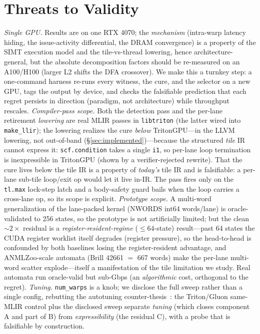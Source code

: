 \documentclass[conference]{IEEEtran}
\begin{document}
\section{Threats to Validity}
\emph{Single GPU.} Results are on one RTX 4070; the \emph{mechanism} (intra-warp latency hiding, the
issue-activity differential, the DRAM convergence) is a property of the SIMT execution model and the
tile-vs-thread lowering, hence architecture-general, but the absolute decomposition factors should be
re-measured on an A100/H100 (larger L2 shifts the DFA crossover). We make this a turnkey step: a
one-command harness re-runs every witness, the cure, and the selector on a new GPU, tags the output by
device, and checks the falsifiable prediction that each regret persists in direction (paradigm, not
architecture) while throughput rescales. \emph{Compiler-pass scope.} Both the detection pass and the per-lane
retirement \emph{lowering} are real MLIR passes in \texttt{libtriton} (the latter wired into
\texttt{make\_llir}); the lowering realizes the cure \emph{below} TritonGPU---in the LLVM lowering, not
out-of-band (\S\ref{sec:implemented})---because the structured \emph{tile} IR cannot express it:
\texttt{scf.condition} takes a single \texttt{i1}, so per-lane loop termination is inexpressible in
TritonGPU (shown by a verifier-rejected rewrite). That the cure lives below the tile IR is a property of
\emph{today's} tile IR and is falsifiable: a per-lane sub-tile loop/exit op would let it live in-IR. The
pass fires only on the \texttt{tl.max} lock-step latch and a body-safety guard bails when the loop carries
a cross-lane op, so its scope is explicit. \emph{Prototype scope.} A multi-word
generalization of the lane-packed kernel (NWORDS int64 words/lane) is oracle-validated to 256 states,
so the prototype is not artificially limited; but the clean ${\sim}2\times$ residual is a
\emph{register-resident-regime} ($\le 64$-state) result---past 64 states the CUDA register worklist
itself degrades (register pressure), so the head-to-head is confounded by both baselines losing the
register-resident advantage, and ANMLZoo-scale automata (Brill 42661 $=$ 667 words) make the per-lane
multi-word scatter explode---itself a manifestation of the tile limitation we study. Real automata run
oracle-valid but sub-Gbps (an \emph{algorithmic} cost, orthogonal to the regret). \emph{Tuning.} \texttt{num\_warps} is a knob; we
disclose the full sweep rather than a single config, rebutting the autotuning
counter-thesis~\cite{ringlein2025}: the Triton/Gluon same-MLIR control plus the disclosed sweep
separate \emph{tuning} (which closes component A and part of B) from \emph{expressibility} (the
residual C), with a probe that is falsifiable by construction.
\end{document}
